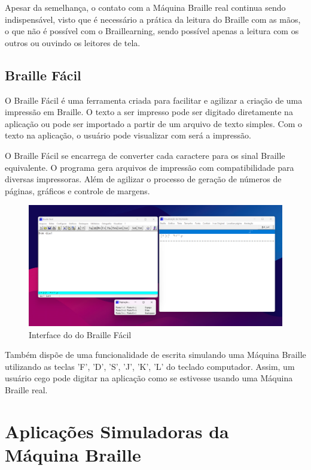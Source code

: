 Apesar da semelhança, o contato com a Máquina Braille real continua sendo indispensável, visto que é necessário a prática da leitura do Braille com as mãos, o que não é possível com o Braillearning, sendo possível apenas a leitura com os outros ou ouvindo os leitores de tela.

\subsection{Braille Fácil}

O Braille Fácil \parencite{REF09} é uma ferramenta criada para facilitar e agilizar a criação de uma impressão em Braille. O texto a ser impresso pode ser digitado diretamente na aplicação ou pode ser importado a partir de um arquivo de texto simples. Com o texto na aplicação, o usuário pode visualizar com será a impressão. 

O Braille Fácil se encarrega de converter cada caractere para os sinal Braille equivalente. O programa gera arquivos de impressão com compatibilidade para diversas impressoras. Além de agilizar o processo de geração de números de páginas, gráficos e controle de margens.

\begin{figure}[h]
    \centering
    \includegraphics[scale=0.3]{ch02/assets/braille-facil-gui.png}
    \decoRule
    \caption[Interface do Braille Fácil]{Interface do do Braille Fácil}
    \label{fig:ch02-braille-facil-gui}
\end{figure}

Também dispõe de uma funcionalidade de escrita simulando uma Máquina Braille utilizando as teclas 'F', 'D', 'S', 'J', 'K', 'L' do teclado computador. Assim, um usuário cego pode digitar na aplicação como se estivesse usando uma Máquina Braille real.

\section{Aplicações Simuladoras da Máquina Braille}

